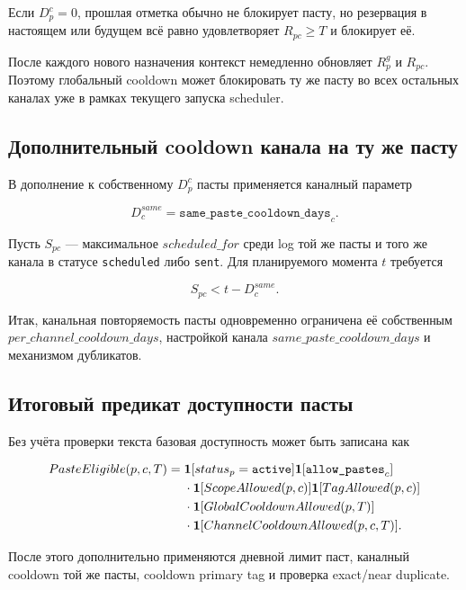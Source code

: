 \documentclass[12pt,a4paper]{article}
\newcommand{\Ind}{\mathbf{1}}
\newcommand{\Status}[1]{\texttt{#1}}
\newcommand{\Field}[1]{\texttt{#1}}
\begin{document}
Если $D_p^c=0$, прошлая отметка обычно не блокирует пасту, но резервация в
настоящем или будущем всё равно удовлетворяет $R_{pc}\geq T$ и блокирует её.

После каждого нового назначения контекст немедленно обновляет $R_p^g$ и
$R_{pc}$. Поэтому глобальный cooldown может блокировать ту же пасту во всех
остальных каналах уже в рамках текущего запуска scheduler.

\subsection{Дополнительный cooldown канала на ту же пасту}

В дополнение к собственному $D_p^c$ пасты применяется каналный параметр

\begin{equation}
  D_c^{same}=\Field{same\_paste\_cooldown\_days}_c.
\end{equation}

Пусть $S_{pc}$ --- максимальное $scheduled\_for$ среди log той же пасты и того
же канала в статусе \Status{scheduled} либо \Status{sent}. Для планируемого
момента $t$ требуется

\begin{equation}
  S_{pc}<t-D_c^{same}.
  \label{eq:same-paste-cooldown}
\end{equation}

Итак, канальная повторяемость пасты одновременно ограничена её собственным
$per\_channel\_cooldown\_days$, настройкой канала
$same\_paste\_cooldown\_days$ и механизмом дубликатов.

\subsection{Итоговый предикат доступности пасты}

Без учёта проверки текста базовая доступность может быть записана как

\begin{align}
  PasteEligible(p,c,T)={}&
  \Ind[status_p=\Status{active}]
  \Ind[\Field{allow\_pastes}_c]\notag\\
  &\cdot\Ind[ScopeAllowed(p,c)]
  \Ind[TagAllowed(p,c)]\notag\\
  &\cdot\Ind[GlobalCooldownAllowed(p,T)]\notag\\
  &\cdot\Ind[ChannelCooldownAllowed(p,c,T)].
  \label{eq:paste-eligible}
\end{align}

После этого дополнительно применяются дневной лимит паст, каналный cooldown той
же пасты, cooldown primary tag и проверка exact/near duplicate.
\end{document}
